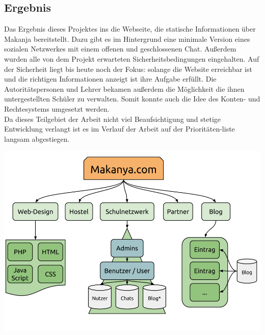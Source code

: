 \subsection{Ergebnis} %
Das Ergebnis dieses Projektes ins die Webseite,
die statische Informationen über Makanja bereitstellt.
Dazu gibt es im Hintergrund eine minimale Version
eines sozialen Netzwerkes mit einem offenen und geschlossenen Chat.
Außerdem wurden alle von dem Projekt erwarteten Sicherheitsbedingungen eingehalten.
Auf der Sicherheit liegt bis heute noch der Fokus:
solange die Website erreichbar ist und
die richtigen Informationen anzeigt ist ihre Aufgabe erfüllt.
Die Autoritätspersonen und Lehrer bekamen außerdem
die Möglichkeit die ihnen untergestellten Schüler zu verwalten.
Somit konnte auch die Idee des Konten- und Rechtesystems umgesetzt werden.\\
Da dieses Teilgebiet der Arbeit nicht viel Beaufsichtigung und stetige Entwicklung verlangt ist
es im Verlauf der Arbeit auf der Prioritäten-liste langsam abgestiegen.
\begin{center}
\includegraphics[width=\linewidth]{imgs/makanyaOverview.png}
\end{center}
